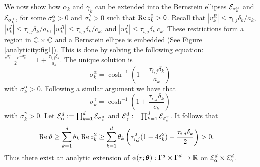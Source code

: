 \documentclass[11pt,final]{amsart}       %
\begin{document}
We now show how $\alpha_k$ and $\gamma_k$ can be extended into the
Bernstein ellipses ${\mathcal E}_{\sigma^{\alpha}_k}$ and
${\mathcal E}_{\sigma^{\gamma}_k}$, for some $\sigma^{\alpha}_k > 0$ and
$\sigma^{\gamma}_k > 0$ such that $\mathop{\text{\rm Re}} z^2_k > 0$. Recall that
$|v^R_k|\leq \tau_{i,j} \delta_{k} / a_{k}$, $|v^I_k|\leq \tau_{i,j}
\delta_{k}/a_{k}$, $|w^R_k|\leq \tau_{i,j} \delta_{k} / c_{k}$, and
$|w^I_k|\leq \tau_{i,j} \delta_{k} \ c_{k}$.
These restrictions form a region in $\mathbb{C} \times \mathbb{C}$ and a Bernstein
ellipse is embedded (See Figure \ref{analyticity:fig1}).  This is done
by solving the following equation: $\frac{e^{\sigma^{\alpha}_k} +
  e^{-\sigma^{\alpha}_k}}{2} = 1 + \frac{\tau_{i,j}
  \delta_{k}}{a_k}$. The unique solution is
\[
\sigma^{\alpha}_k = \cosh^{-1} \left(1 +
\frac{\tau_{i,j} \delta_{k}}{a_k}
\right)
\]
with $\sigma^{\alpha}_k > 0$. Following a
similar argument we have that
\[
\sigma^{\gamma}_k = \cosh^{-1} \left(1
+ \frac{\tau_{i,j} \delta_{k}}{c_k}
\right)
\]
with $\sigma^{\gamma}_k > 0$. Let ${\mathcal E}^{d}_{\alpha} :=
\prod_{k=1}^{d} {\mathcal E}_{\sigma^{\alpha}_k}$ and ${\mathcal E}^{d}_{\gamma} :=
\prod_{k=1}^{d} {\mathcal E}_{\sigma^{\gamma}_k}$.  It follows that
\begin{equation}
\begin{split}
  \mathop{\text{\rm Re}} \vartheta &\geq  
  \sum_{k=1}^{d} \theta_k
  \mathop{\text{\rm Re}} z^2_k 
  \geq
\sum_{k=1}^{d} \theta_k 
  \left(
  \tau_{i,j}^2 (1 - 4 \delta_{k}^2) - \frac{\tau_{i,j}
    \delta_{k}}{2} \right)
  > 0.
  \end{split}
\label{errorestimates:eqn8}
\end{equation}
Thus there exist an analytic extension of $\phi(r;\boldsymbol{\theta}):\Gamma^d
\times \Gamma^d \rightarrow \Bbb{R}$ on ${\mathcal E}^{d}_{\alpha} \times
{\mathcal E}^{d}_{\gamma}$.
\end{document}
